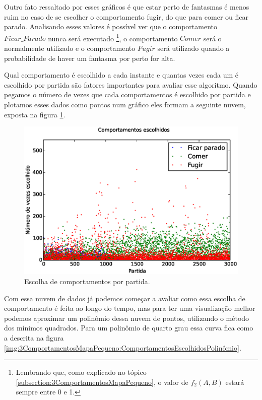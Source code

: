 Outro fato ressaltado por esses gráficos é que estar perto de fantasmas é menos ruim no caso de se escolher o comportamento fugir, do que para comer ou ficar parado. Analisando esses valores é possível ver que o comportamento $ Ficar\_Parado $ nunca será executado%
\footnote{Lembrando que, como explicado no tópico \ref{subsection:3ComportamentosMapaPequeno}, o valor de $ f_2 \left( A, B \right) $ estará sempre entre 0 e 1.%
}, o comportamento $ Comer $ será o normalmente utilizado e o comportamento $ Fugir $ será utilizado quando a probabilidade de haver um fantasma por perto for alta.

Qual comportamento é escolhido a cada instante e quantas vezes cada um é escolhido por partida são fatores importantes para avaliar esse algoritmo. Quando pegamos o número de vezes que cada comportamentos é escolhido por partida e plotamos esses dados como pontos num gráfico eles formam a seguinte nuvem, exposta na figura \ref{img:3ComportamentosMapaPequeno:ComportamentosEscolhidos}.

\begin{figure}[H]
    \centering
    \includegraphics[width=\linewidth]{images/3_behaviors_small_map/chosen_behaviors}
    \caption{Escolha de comportamentos por partida.}
    \label{img:3ComportamentosMapaPequeno:ComportamentosEscolhidos}
\end{figure}

Com essa nuvem de dados já podemos começar a avaliar como essa escolha de comportamento é feita ao longo do tempo, mas para ter uma visualização melhor podemos aproximar um polinômio dessa nuvem de pontos, utilizando o método dos mínimos quadrados. Para um polinômio de quarto grau essa curva fica como a descrita na figura \ref{img:3ComportamentosMapaPequeno:ComportamentosEscolhidosPolinômio}.

